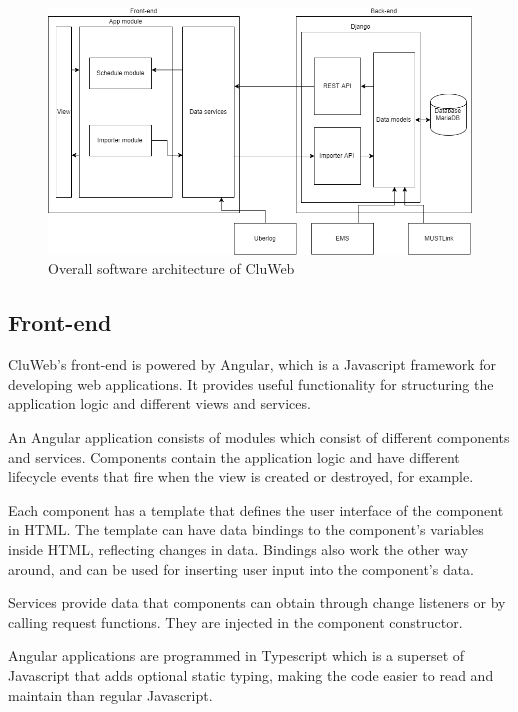 \begin{figure}[ht]
  \begin{center}
    \includegraphics*[width=1\textwidth]{architecture}
  \end{center}
  \caption{Overall software architecture of CluWeb}
  \label{fig:cluweb_architecture}
\end{figure}

\subsection{Front-end}
CluWeb's front-end is powered by Angular, which is a Javascript framework for developing web applications. It provides useful functionality for structuring the application logic and different views and services.

An Angular application consists of modules which consist of different components and services. Components contain the application logic and have different lifecycle events that fire when the view is created or destroyed, for example.

Each component has a template that defines the user interface of the component in HTML. The template can have data bindings to the component's variables inside HTML, reflecting changes in data. Bindings also work the other way around, and can be used for inserting user input into the component's data.

Services provide data that components can obtain through change listeners or by calling request functions. They are injected in the component constructor.

Angular applications are programmed in Typescript which is a superset of Javascript that adds optional static typing, making the code easier to read and maintain than regular Javascript.

